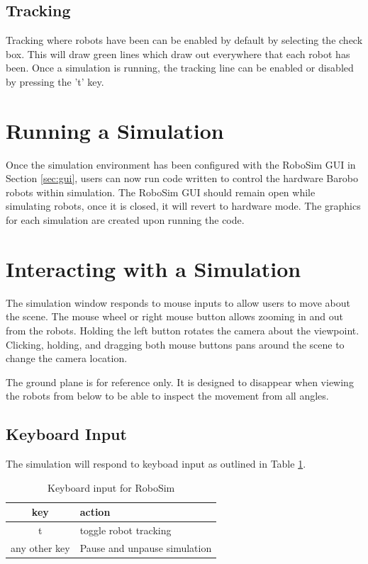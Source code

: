 \documentclass{article}
\begin{document}
\subsection{Tracking}
Tracking where robots have been can be enabled by default by selecting the
check box.  This will draw green lines which draw out everywhere that each robot
has been.  Once a simulation is running, the tracking line can be enabled or
disabled by pressing the 't' key.

\section{Running a Simulation}
Once the simulation environment has been configured with the RoboSim GUI in
Section \ref{sec:gui}, users can now run code written to control the hardware
Barobo robots within simulation.  The RoboSim GUI should remain open while
simulating robots, once it is closed, it will revert to hardware mode.  The
graphics for each simulation are created upon running the code.

\section{Interacting with a Simulation}
The simulation window responds to mouse inputs to allow users to move about the
scene.  The mouse wheel or right mouse button allows zooming in and out from the
robots.  Holding the left button rotates the camera about the viewpoint.
Clicking, holding, and dragging both mouse buttons pans around the scene to
change the camera location.

The ground plane is for reference only.  It is designed to disappear when
viewing the robots from below to be able to inspect the movement from all
angles.

\subsection{Keyboard Input}
The simulation will respond to keyboad input as outlined in Table
\ref{tab:keys}.

\begin{table}[H]
	\begin{center}
	\begin{tabular}{c | l }
		\hline \hline
		\textbf{key} & \textbf{action} \\ \hline
		t & toggle robot tracking \\
		any other key & Pause and unpause simulation \\
		\hline \hline
	\end{tabular}
	\caption{Keyboard input for RoboSim}
	\label{tab:keys}
	\end{center}
\end{table}
\end{document}
